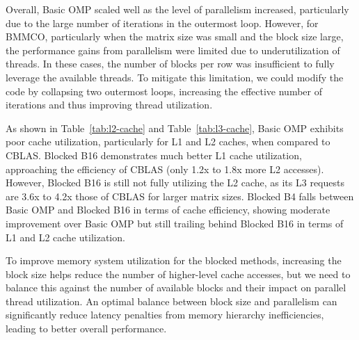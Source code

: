 Overall, Basic OMP scaled well as the level of parallelism increased, particularly due to the large number of iterations in the outermost loop. However, for BMMCO, particularly when the matrix size was small and the block size large, the performance gains from parallelism were limited due to underutilization of threads. In these cases, the number of blocks per row was insufficient to fully leverage the available threads. To mitigate this limitation, we could modify the code by collapsing two outermost loops, increasing the effective number of iterations and thus improving thread utilization.

As shown in Table~\ref{tab:l2-cache} and Table~\ref{tab:l3-cache}, Basic OMP exhibits poor cache utilization, particularly for L1 and L2 caches, when compared to CBLAS. Blocked B16 demonstrates much better L1 cache utilization, approaching the efficiency of CBLAS (only 1.2x to 1.8x more L2 accesses). However, Blocked B16 is still not fully utilizing the L2 cache, as its L3 requests are 3.6x to 4.2x those of CBLAS for larger matrix sizes. Blocked B4 falls between Basic OMP and Blocked B16 in terms of cache efficiency, showing moderate improvement over Basic OMP but still trailing behind Blocked B16 in terms of L1 and L2 cache utilization.

To improve memory system utilization for the blocked methods, increasing the block size helps reduce the number of higher-level cache accesses, but we need to balance this against the number of available blocks and their impact on parallel thread utilization. An optimal balance between block size and parallelism can significantly reduce latency penalties from memory hierarchy inefficiencies, leading to better overall performance.
